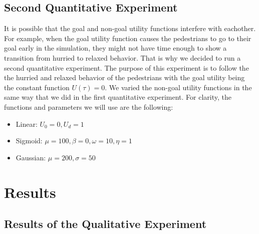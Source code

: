\documentclass[11pt, a4paper]{book}
\begin{document}
\section{Second Quantitative Experiment}
\label{sec:quantitativeexp2}
It is possible that the goal and non-goal utility functions interfere with eachother. For example, when the goal utility function causes the pedestrians to go to their goal early in the simulation, they might not have time enough to show a transition from hurried to relaxed behavior. That is why we decided to run a second quantitative experiment. The purpose of this experiment is to follow the the hurried and relaxed behavior of the pedestrians with the goal utility being the constant function $U(\tau)=0$. We varied the non-goal utility functions in the same way that we did in the first quantitative experiment. For clarity, the functions and parameters we will use are the following:
\begin{itemize}
\item Linear: $U_0=0, U_d=1$
\item Sigmoid: $\mu=100, \beta=0, \omega=10, \eta=1$
\item Gaussian: $\mu=200, \sigma=50$
\end{itemize}

\chapter{Results}
\label{chap:results}

\section{Results of the Qualitative Experiment}
\label{sec:qualitativeresults}
\end{document}
